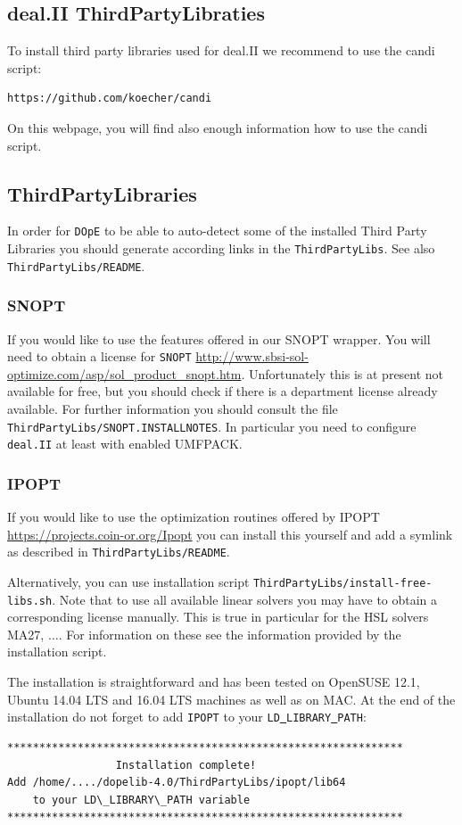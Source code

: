 \subsection{deal.II ThirdPartyLibraties}
To install third party libraries used for deal.II we recommend to use
the candi script:
\begin{lstlisting}
https://github.com/koecher/candi
\end{lstlisting}
On this webpage, you will find also enough information how to use 
the candi script.

\subsection{ThirdPartyLibraries}
In order for \texttt{DOpE} to be able to auto-detect some of the installed 
Third Party Libraries you should generate according links in the 
\texttt{ThirdPartyLibs}. See also \texttt{ThirdPartyLibs/README}.

\subsubsection{SNOPT}
If you would like to use the features offered in our SNOPT wrapper. You will 
need to obtain a license for \texttt{SNOPT} 
\url{http://www.sbsi-sol-optimize.com/asp/sol_product_snopt.htm}.
Unfortunately this is at present not available for free, but you should 
check if 
there is a department license already available.
For further information you should consult the file 
\texttt{ThirdPartyLibs/SNOPT.INSTALLNOTES}. In particular you need to configure 
\texttt{deal.II} at least with enabled UMFPACK.




\subsubsection{IPOPT}
If you would like to use the optimization routines offered by IPOPT
\url{https://projects.coin-or.org/Ipopt} you can  
install this yourself and add a symlink as described in \texttt{ThirdPartyLibs/README}.

Alternatively, you can use installation script
\texttt{ThirdPartyLibs/install-free-libs.sh}. Note that to use all 
available linear solvers you may have to obtain a corresponding license 
manually. This is true in particular for the HSL solvers MA27, $\ldots$.
For information on these see the information provided by the installation
script.

The installation is straightforward and has been tested on OpenSUSE
12.1, Ubuntu 14.04 LTS and 16.04 LTS
machines as well as on MAC. At the end of the installation do not forget to
add \texttt{IPOPT} to your \texttt{LD\underline{ }LIBRARY\underline{ }PATH}:
\begin{lstlisting}
**************************************************************
                 Installation complete!
Add /home/..../dopelib-4.0/ThirdPartyLibs/ipopt/lib64
    to your LD\_LIBRARY\_PATH variable
**************************************************************
\end{lstlisting}


